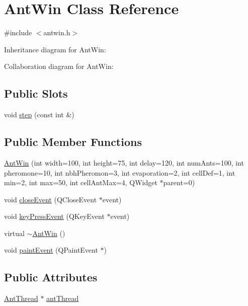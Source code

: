 \hypertarget{classAntWin}{}\section{Ant\+Win Class Reference}
\label{classAntWin}


{\ttfamily \#include $<$antwin.\+h$>$}



Inheritance diagram for Ant\+Win\+:


Collaboration diagram for Ant\+Win\+:
\subsection*{Public Slots}
\begin{DoxyCompactItemize}
\item 
void \hyperlink{classAntWin_a1f961a07c7e07c0ec186438eee1f0ef8}{step} (const int \&)
\end{DoxyCompactItemize}
\subsection*{Public Member Functions}
\begin{DoxyCompactItemize}
\item 
\hyperlink{classAntWin_af6c410bc74c5776103b80cad51a88e90}{Ant\+Win} (int width=100, int height=75, int delay=120, int num\+Ants=100, int pheromone=10, int nbh\+Pheromon=3, int evaporation=2, int cell\+Def=1, int min=2, int max=50, int cell\+Ant\+Max=4, Q\+Widget $\ast$parent=0)
\item 
void \hyperlink{classAntWin_a013de5573b35b0a9ba2f7b3fd314c25c}{close\+Event} (Q\+Close\+Event $\ast$event)
\item 
void \hyperlink{classAntWin_a0a8300f161559f14a3fd9d646fed1478}{key\+Press\+Event} (Q\+Key\+Event $\ast$event)
\item 
virtual \hyperlink{classAntWin_a55d3e3887a31643fb2d6fc9b7a421299}{$\sim$\+Ant\+Win} ()
\item 
void \hyperlink{classAntWin_aa2f05b53e7e105c1e3985298666b5eb8}{paint\+Event} (Q\+Paint\+Event $\ast$)
\end{DoxyCompactItemize}
\subsection*{Public Attributes}
\begin{DoxyCompactItemize}
\item 
\hyperlink{classAntThread}{Ant\+Thread} $\ast$ \hyperlink{classAntWin_a7737ac6531de9aadb9922bea7ffa716b}{ant\+Thread}
\end{DoxyCompactItemize}


